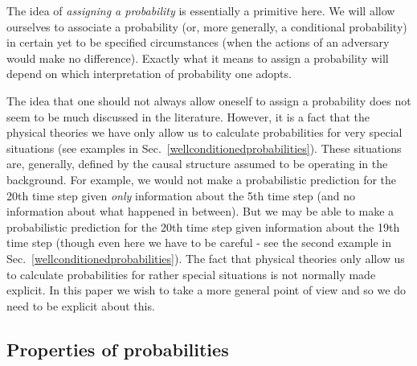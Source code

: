 \documentclass[10pt]{article}
\begin{document}
The idea of \emph{assigning a probability} is essentially a primitive here.  We will allow ourselves to associate a probability (or, more generally, a conditional probability) in certain yet to be specified circumstances (when the actions of an adversary would make no difference).  Exactly what it means to assign a probability will depend on which interpretation of probability one adopts.

The idea that one should not always allow oneself to assign a probability does not seem to be much discussed in the literature.  However, it is a fact that the physical theories we have only allow us to calculate probabilities for very special situations (see examples in Sec.\ \ref{wellconditionedprobabilities}).  These situations are, generally, defined by the causal structure assumed to be operating in the background. For example, we would not make a probabilistic prediction for the 20th time step given \emph{only} information about the 5th time step (and no information about what happened in between).  But we may be able to make a probabilistic prediction for the 20th time step given information about the 19th time step (though even here we have to be careful - see the second example in Sec.\ \ref{wellconditionedprobabilities}).   The fact that physical theories only allow us to calculate probabilities for rather special situations is not normally made explicit.   In this paper we wish to take a more general point of view and so we do need to be explicit about this.

\subsection{Properties of probabilities}\label{propertiesofprobabilities}
\end{document}
